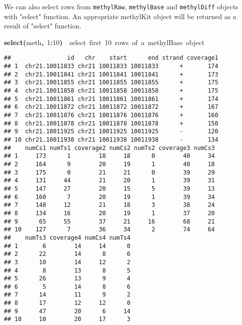 \documentclass{article}
\makeatletter
\newcommand{\hlnumber}[1]{\textcolor[rgb]{0,0,0}{#1}}%
\newcommand{\hlfunctioncall}[1]{\textcolor[rgb]{.5,0,.33}{\textbf{#1}}}%
\newcommand{\hlkeyword}[1]{\textbf{#1}}%
\newcommand{\hlcomment}[1]{\textcolor[rgb]{.18,.6,.34}{#1}}%
\newcommand{\hlsymbol}[1]{#1}%
\newenvironment{kframe}{%
 \def\FrameCommand##1{\hskip\@totalleftmargin \hskip-\fboxsep
 \colorbox{shadecolor}{##1}\hskip-\fboxsep
     \hskip-\linewidth \hskip-\@totalleftmargin \hskip\columnwidth}%
 \MakeFramed {\advance\hsize-\width
   \@totalleftmargin\z@ \linewidth\hsize
   \@setminipage}}%
 {\par\unskip\endMakeFramed}
\newenvironment{knitrout}{}{} %
\makeatother
\begin{document}
We can also select rows from \texttt{methylRaw}, \texttt{methylBase} and \texttt{methylDiff} objects with "select" function. An appropriate methylKit object will be returned as a result of "select" function. 
\begin{knitrout}
\color{fgcolor}\begin{kframe}
\begin{flushleft}
\ttfamily\noindent
\hlfunctioncall{select}\hlkeyword{(}\hlsymbol{meth}\hlkeyword{,}{\ }\hlnumber{1}\hlkeyword{:}\hlnumber{10}\hlkeyword{)}{\ }{\ }\hlcomment{\usebox{\hlnormalsizeboxhash}{\ }select{\ }first{\ }10{\ }rows{\ }of{\ }a{\ }methylBase{\ }object}\mbox{}
\normalfont
\end{flushleft}
\begin{verbatim}
##                id   chr    start      end strand coverage1
## 1  chr21.10011833 chr21 10011833 10011833      +       174
## 2  chr21.10011841 chr21 10011841 10011841      +       173
## 3  chr21.10011855 chr21 10011855 10011855      +       175
## 4  chr21.10011858 chr21 10011858 10011858      +       175
## 5  chr21.10011861 chr21 10011861 10011861      +       174
## 6  chr21.10011872 chr21 10011872 10011872      +       167
## 7  chr21.10011876 chr21 10011876 10011876      +       160
## 8  chr21.10011878 chr21 10011878 10011878      +       150
## 9  chr21.10011925 chr21 10011925 10011925      -       120
## 10 chr21.10011938 chr21 10011938 10011938      -       134
##    numCs1 numTs1 coverage2 numCs2 numTs2 coverage3 numCs3
## 1     173      1        18     18      0        40     34
## 2     164      9        20     19      1        40     18
## 3     175      0        21     21      0        39     29
## 4     131     44        21     20      1        39     31
## 5     147     27        20     15      5        39     13
## 6     160      7        20     19      1        39     34
## 7     148     12        21     18      3        38     24
## 8     134     16        20     19      1        37     20
## 9      65     55        37     21     16        68     21
## 10    127      7        36     34      2        74     64
##    numTs3 coverage4 numCs4 numTs4
## 1       6        14     14      0
## 2      22        14      8      6
## 3      10        14     12      2
## 4       8        13      8      5
## 5      26        13      9      4
## 6       5        14      8      6
## 7      14        11      9      2
## 8      17        12     12      0
## 9      47        20      6     14
## 10     10        20     17      3
\end{verbatim}

\end{kframe}
\end{knitrout}
\end{document}
